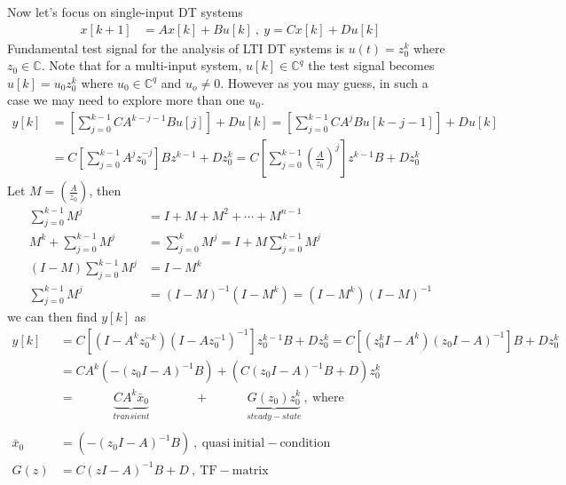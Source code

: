 \documentclass[twoside]{article}
\begin{document}
Now let's focus on single-input DT systems 
%
\begin{align*}
       x[k+1] &= A x[k] + B u[k] \ , \ y = C x[k] + D u[k]
\end{align*}
%
Fundamental test signal for the analysis of LTI DT systems is $u(t) = z_0^{k}$ where $z_0 \in \mathbb{C}$. Note that for a multi-input system, $u[k] \in \mathbb{C}^q$ the test signal becomes $u[k] = u_0 z_0^{k}$ where $u_0 \in \mathbb{C}^q$ and $u_o \neq 0$. However as you may guess, in such a case we may need to explore more than one $u_0$.
%
\begin{align*}
 y[k] &= \left[ \sum\limits_{j = 0}^{k-1} C A^{k-j-1} B u[j] \right] + D u[k] = \left[ \sum\limits_{j = 0}^{k-1} C A^{j} B u[k-j-1] \right] + D u[k] 
 \\
 &= C \left[ \sum\limits_{j = 0}^{k-1} A^{j} z^{-j}_0 \right] B z^{k-1} + D z_0^k = C \left[ \sum\limits_{j = 0}^{k-1} \left( \frac{A}{z_0} \right)^j \right] z^{k-1} B + D z_0^k 
\end{align*}
%
Let $M = \left( \frac{A}{z_0} \right)$, then 
%
\begin{align*}
\sum\limits_{j = 0}^{k-1} M^j &= I + M + M^2 + \cdots + M^{n-1}
\\
M^k + \sum\limits_{j = 0}^{k-1} M^j &= \sum\limits_{j = 0}^{k} M^j = I + M \sum\limits_{j = 0}^{k-1} M^j
\\
(I - M) \sum\limits_{j = 0}^{k-1} M^j &= I - M^k 
\\
\sum\limits_{j = 0}^{k-1} M^j &= (I - M)^{-1} \left( I - M^k  \right) = \left( I - M^k  \right) (I - M)^{-1}
\end{align*}
%
we can then find $y[k]$ as
%
\begin{align*}
 y[k] &= C \left[ \left( I - A^k z_0^{-k}  \right) \left(I - A z_0^{-1} \right)^{-1} \right] z_0^{k-1} B + D z_0^k
 = C \left[ \left( z_0^k I - A^k \right) \left(z_0 I - A \right)^{-1} \right] B + D z_0^k
 \\
 &= C A^k \left( - \left(z_0 I - A \right)^{-1} B \right) + \left( C \left(z_0 I - A \right)^{-1} B + D \right) z_0^k
 \\
  &= \quad \quad  \quad  \underbrace{C A^k \bar{x}_0}_{transient}  \quad \quad \quad \ \ \, +
   \quad \quad \quad \underbrace{G(z_0) z_0^k}_{steady-state} \ , \ \mathrm{where}
   \\
   \\
   \bar{x}_0 &= \left( - \left(z_0 I - A \right)^{-1} B \right) \ , \ \mathrm{quasi} \ \mathrm{initial-condition}
   \\
   G(z) &= C (z I - A)^{-1} B + D \ , \ \mathrm{TF-matrix} 
\end{align*}
\end{document}
